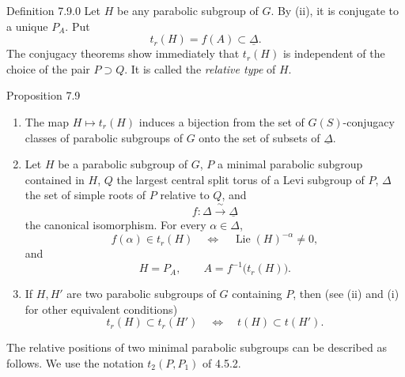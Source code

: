 \begin{sgastatement}{Definition 7.9.0}
Let \(H\) be any parabolic subgroup of \(G\).  By
\textup{(ii)}, it is conjugate to a unique \(P_A\).  Put
\[
 t_r(H)=f(A)\subset\underline\Delta.
\]
The conjugacy theorems show immediately that \(t_r(H)\) is
independent of the choice of the pair \(P\supset Q\).  It is called
the \emph{relative type} of \(H\).
\end{sgastatement}

\begin{sgastatement}{Proposition 7.9}
\begin{enumerate}[label=\textup{(\roman*)}]
\item The map \(H\mapsto t_r(H)\) induces a bijection from the set of
\(G(S)\)-conjugacy classes of parabolic subgroups of \(G\) onto the
set of subsets of \(\underline\Delta\).
\item Let \(H\) be a parabolic subgroup of \(G\), \(P\) a minimal
parabolic subgroup contained in \(H\), \(Q\) the largest central
split torus of a Levi subgroup of \(P\), \(\Delta\) the set of
simple roots of \(P\) relative to \(Q\), and
\[
 f:\Delta\xrightarrow{\ \sim\ }\underline\Delta
\]
the canonical isomorphism.  For every \(\alpha\in\Delta\),
\[
 f(\alpha)\in t_r(H)
 \quad\Longleftrightarrow\quad
 \operatorname{Lie}(H)^{-\alpha}\ne0,
\]
and
\[
 H=P_A,\qquad A=f^{-1}\bigl(t_r(H)\bigr).
\]
\item If \(H,H'\) are two parabolic subgroups of \(G\) containing
\(P\), then \textup{(see \textup{(ii)} and
\textup{(i)} for other equivalent conditions)}
\[
 t_r(H)\subset t_r(H')
 \quad\Longleftrightarrow\quad
 t(H)\subset t(H').
\]
\end{enumerate}
\end{sgastatement}



The relative positions of two minimal parabolic subgroups can be
described as follows.  We use the notation \(t_2(P,P_1)\) of 4.5.2.

